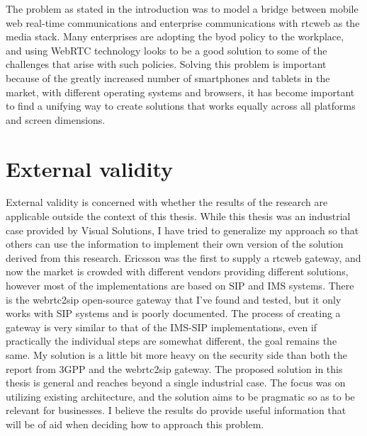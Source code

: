 

The problem as stated in the introduction was to model a bridge between mobile web real-time communications and enterprise communications with \gls{rtcweb} as the media stack. Many enterprises are adopting the \gls{byod} policy to the workplace, and using WebRTC technology looks to be a good solution to some of the challenges that arise with such policies. Solving this problem is important because of the greatly increased number of smartphones and tablets in the market, with different operating systems and browsers, it has become important to find a unifying way to create solutions that works equally across all platforms and screen dimensions.


\section{External validity}
External validity is concerned with whether the results of the research are applicable outside the context of this thesis. While this thesis was an industrial case provided by Visual Solutions, I have tried to generalize my approach so that others can use the information to implement their own version of the solution derived from this research. Ericsson was the first to supply a \gls{rtcweb} gateway, and now the market is crowded with different vendors providing different solutions, however most of the implementations are based on SIP and IMS systems. There is the webrtc2sip open-source gateway that I've found and tested, but it only works with SIP systems and is poorly documented. The process of creating a gateway is very similar to that of the IMS-SIP implementations, even if practically the individual steps are somewhat different, the goal remains the same. My solution is a little bit more heavy on the security side than both the report from 3GPP\cite{3gpp-wrtc-access-ims} and the webrtc2sip gateway. The proposed solution in this thesis is general and reaches beyond a single industrial case. The focus was on utilizing existing architecture, and the solution aims to be pragmatic so as to be relevant for businesses. I believe the results do provide useful information that will be of aid when deciding how to approach this problem.

